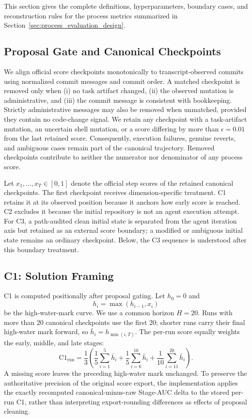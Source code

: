 This section gives the complete definitions, hyperparameters, boundary cases, and reconstruction rules for the process metrics summarized in Section~\ref{sec:process_evaluation_design}.

\subsection{Proposal Gate and Canonical Checkpoints}

We align official score checkpoints monotonically to transcript-observed commits using normalized commit messages and commit order.  A matched checkpoint is removed only when (i) no task artifact changed, (ii) the observed mutation is administrative, and (iii) the commit message is consistent with bookkeeping.  Strictly administrative messages may also be removed when unmatched, provided they contain no code-change signal.  We retain any checkpoint with a task-artifact mutation, an uncertain shell mutation, or a score differing by more than $\epsilon=0.01$ from the last retained score.  Consequently, execution failures, genuine reverts, and ambiguous cases remain part of the canonical trajectory.  Removed checkpoints contribute to neither the numerator nor denominator of any process score.

Let $x_1,\ldots,x_T\in[0,1]$ denote the official step scores of the retained canonical checkpoints.  The first checkpoint receives dimension-specific treatment.  C1 retains it at its observed position because it anchors how early score is reached.  C2 excludes it because the initial repository is not an agent execution attempt.  For C3, a path-audited clean initial state is separated from the agent iteration axis but retained as an external score boundary; a modified or ambiguous initial state remains an ordinary checkpoint.  Below, the C3 sequence is understood after this boundary treatment.

\subsection{C1: Solution Framing}

C1 is computed positionally after proposal gating.  Let $h_0=0$ and
\[
  h_i=\max(h_{i-1},x_i)
\]
be the high-water-mark curve.  We use a common horizon $H=20$.  Runs with more than 20 canonical checkpoints use the first 20; shorter runs carry their final high-water mark forward, so $\bar h_i=h_{\min(i,T)}$.  The per-run score equally weights the early, middle, and late stages:
\[
\mathrm{C1}_{\mathrm{run}}=\frac{1}{3}\left(
  \frac{1}{5}\sum_{i=1}^{5}\bar h_i+
  \frac{1}{5}\sum_{i=6}^{10}\bar h_i+
  \frac{1}{10}\sum_{i=11}^{20}\bar h_i
\right).
\]
A missing score leaves the preceding high-water mark unchanged.  To preserve the authoritative precision of the original score export, the implementation applies the exactly recomputed canonical-minus-raw Stage-AUC delta to the stored per-run C1, rather than interpreting export-rounding differences as effects of proposal cleaning.


